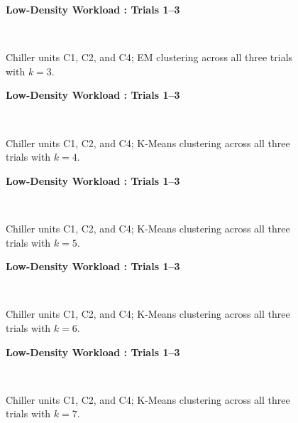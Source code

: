 \begin{figure}[!h]
\centerline{\bfseries\large Low-Density Workload : Trials 1--3}\\
\caption{Chiller units C1, C2, and C4; EM clustering across all three trials with $k=3$.}
\end{figure}
\begin{figure}[!h]
\centerline{\bfseries\large Low-Density Workload : Trials 1--3}\\
\caption{Chiller units C1, C2, and C4; K-Means clustering across all three trials with $k=4$.}
\end{figure}
\begin{figure}[!h]
\centerline{\bfseries\large Low-Density Workload : Trials 1--3}\\
\caption{Chiller units C1, C2, and C4; K-Means clustering across all three trials with $k=5$.}
\end{figure}
\begin{figure}[!h]
\centerline{\bfseries\large Low-Density Workload : Trials 1--3}\\
\caption{Chiller units C1, C2, and C4; K-Means clustering across all three trials with $k=6$.}
\end{figure}
\begin{figure}[!h]
\centerline{\bfseries\large Low-Density Workload : Trials 1--3}\\
\caption{Chiller units C1, C2, and C4; K-Means clustering across all three trials with $k=7$.}
\end{figure}
